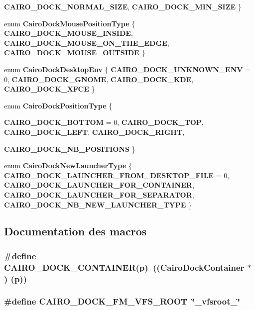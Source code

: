 \begin{CompactItemize}
{\bf CAIRO\_\-DOCK\_\-NORMAL\_\-SIZE}, 
{\bf CAIRO\_\-DOCK\_\-MIN\_\-SIZE}
 \}
\item 
enum {\bf CairoDockMousePositionType} \{ {\bf CAIRO\_\-DOCK\_\-MOUSE\_\-INSIDE}, 
{\bf CAIRO\_\-DOCK\_\-MOUSE\_\-ON\_\-THE\_\-EDGE}, 
{\bf CAIRO\_\-DOCK\_\-MOUSE\_\-OUTSIDE}
 \}
\item 
enum {\bf CairoDockDesktopEnv} \{ {\bf CAIRO\_\-DOCK\_\-UNKNOWN\_\-ENV} = 0, 
{\bf CAIRO\_\-DOCK\_\-GNOME}, 
{\bf CAIRO\_\-DOCK\_\-KDE}, 
{\bf CAIRO\_\-DOCK\_\-XFCE}
 \}
\item 
enum {\bf CairoDockPositionType} \{ \par
{\bf CAIRO\_\-DOCK\_\-BOTTOM} =  0, 
{\bf CAIRO\_\-DOCK\_\-TOP}, 
{\bf CAIRO\_\-DOCK\_\-LEFT}, 
{\bf CAIRO\_\-DOCK\_\-RIGHT}, 
\par
{\bf CAIRO\_\-DOCK\_\-NB\_\-POSITIONS}
 \}
\item 
enum {\bf CairoDockNewLauncherType} \{ {\bf CAIRO\_\-DOCK\_\-LAUNCHER\_\-FROM\_\-DESKTOP\_\-FILE} =  0, 
{\bf CAIRO\_\-DOCK\_\-LAUNCHER\_\-FOR\_\-CONTAINER}, 
{\bf CAIRO\_\-DOCK\_\-LAUNCHER\_\-FOR\_\-SEPARATOR}, 
{\bf CAIRO\_\-DOCK\_\-NB\_\-NEW\_\-LAUNCHER\_\-TYPE}
 \}
\end{CompactItemize}


\subsection{Documentation des macros}
\subsubsection{\setlength{\rightskip}{0pt plus 5cm}\#define CAIRO\_\-DOCK\_\-CONTAINER(p)~(({\bf CairoDockContainer} $\ast$) (p))}\label{cairo-dock-struct_8h_7ea2d84407adc403394a1459bc9c5b1d}


\subsubsection{\setlength{\rightskip}{0pt plus 5cm}\#define CAIRO\_\-DOCK\_\-FM\_\-VFS\_\-ROOT~\char`\"{}\_\-vfsroot\_\-\char`\"{}}\label{cairo-dock-struct_8h_6be33121da500fa2af7d41abba6a88a1}


